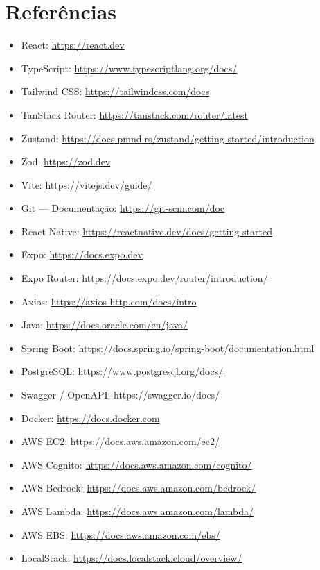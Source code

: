 \chapter*{Referências}

\begin{itemize}
\item
  React: \url{https://react.dev}
\item
  TypeScript: \url{https://www.typescriptlang.org/docs/}
\item
  Tailwind CSS: \url{https://tailwindcss.com/docs}
\item
  TanStack Router: \url{https://tanstack.com/router/latest}
\item
  Zustand:
  \url{https://docs.pmnd.rs/zustand/getting-started/introduction}
\item
  Zod: \url{https://zod.dev}
\item
  Vite: \url{https://vitejs.dev/guide/}
\item
  Git --- Documentação: \url{https://git-scm.com/doc}
\item
  React Native: \url{https://reactnative.dev/docs/getting-started}
\item
  Expo: \url{https://docs.expo.dev}
\item
  Expo Router: \url{https://docs.expo.dev/router/introduction/}
\item
  Axios: \url{https://axios-http.com/docs/intro}
\item
  Java: \url{https://docs.oracle.com/en/java/}
\item
  Spring Boot:
  \url{https://docs.spring.io/spring-boot/documentation.html}
\item
  \href{PostgreSQL:\%20https://www.postgresql.org/docs/}{PostgreSQL:
  https://www.postgresql.org/docs/}
\item
  Swagger / OpenAPI: https://swagger.io/docs/
\item
  Docker: \url{https://docs.docker.com}
\item
  AWS EC2: \url{https://docs.aws.amazon.com/ec2/}
\item
  AWS Cognito: \url{https://docs.aws.amazon.com/cognito/}
\item
  AWS Bedrock: \url{https://docs.aws.amazon.com/bedrock/}
\item
  AWS Lambda: \url{https://docs.aws.amazon.com/lambda/}
\item
  AWS EBS: \url{https://docs.aws.amazon.com/ebs/}
\item
  LocalStack: \url{https://docs.localstack.cloud/overview/}
\end{itemize}


